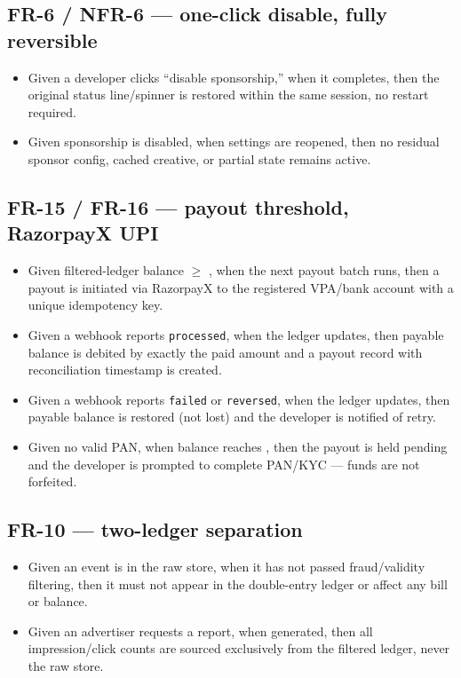 \subsection*{FR-6 / NFR-6 --- one-click disable, fully reversible}
\begin{itemize}
\item Given a developer clicks ``disable sponsorship,'' when it completes, then the original status line/spinner is restored within the same session, no restart required.
\item Given sponsorship is disabled, when settings are reopened, then no residual sponsor config, cached creative, or partial state remains active.
\end{itemize}

\subsection*{FR-15 / FR-16 ---  payout threshold, RazorpayX UPI}
\begin{itemize}
\item Given filtered-ledger balance $\geq$ , when the next payout batch runs, then a payout is initiated via RazorpayX to the registered VPA/bank account with a unique idempotency key.
\item Given a webhook reports \texttt{processed}, when the ledger updates, then payable balance is debited by exactly the paid amount and a payout record with reconciliation timestamp is created.
\item Given a webhook reports \texttt{failed} or \texttt{reversed}, when the ledger updates, then payable balance is restored (not lost) and the developer is notified of retry.
\item Given no valid PAN, when balance reaches , then the payout is held pending and the developer is prompted to complete PAN/KYC --- funds are not forfeited.
\end{itemize}

\subsection*{FR-10 --- two-ledger separation}
\begin{itemize}
\item Given an event is in the raw store, when it has not passed fraud/validity filtering, then it must not appear in the double-entry ledger or affect any bill or balance.
\item Given an advertiser requests a report, when generated, then all impression/click counts are sourced exclusively from the filtered ledger, never the raw store.
\end{itemize}

